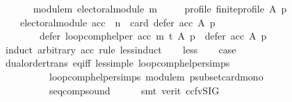 \begin{isabellebody}
\ \ \isanewline
\ \ \ \ module{\isacharunderscore}{\kern0pt}m{\isacharcolon}{\kern0pt}\ {\isachardoublequoteopen}electoral{\isacharunderscore}{\kern0pt}module\ m{\isachardoublequoteclose}\ \isanewline
\ \ \ \ profile{\isacharcolon}{\kern0pt}\ {\isachardoublequoteopen}finite{\isacharunderscore}{\kern0pt}profile\ A\ p{\isachardoublequoteclose}\isanewline
\ \ \isanewline
\ \ \ \ {\isachardoublequoteopen}{\isacharparenleft}{\kern0pt}electoral{\isacharunderscore}{\kern0pt}module\ acc\ {\isasymand}\ n\ {\isacharequal}{\kern0pt}\ card\ {\isacharparenleft}{\kern0pt}defer\ acc\ A\ p{\isacharparenright}{\kern0pt}{\isacharparenright}{\kern0pt}\ {\isasymLongrightarrow}\isanewline
\ \ \ \ \ \ \ \ defer\ {\isacharparenleft}{\kern0pt}loop{\isacharunderscore}{\kern0pt}comp{\isacharunderscore}{\kern0pt}helper\ acc\ m\ t{\isacharparenright}{\kern0pt}\ A\ p\ {\isasymsubseteq}\ defer\ acc\ A\ p{\isachardoublequoteclose}\isanewline
%
\isadelimproof
%
\endisadelimproof
%
\isatagproof
{}\isamarkupfalse%
\ {\isacharparenleft}{\kern0pt}induct\ arbitrary{\isacharcolon}{\kern0pt}\ acc\ rule{\isacharcolon}{\kern0pt}\ less{\isacharunderscore}{\kern0pt}induct{\isacharparenright}{\kern0pt}\isanewline
\ \ \isamarkupfalse%
\ {\isacharparenleft}{\kern0pt}less{\isacharparenright}{\kern0pt}\isanewline
\ \ \isamarkupfalse%
\ {\isacharquery}{\kern0pt}case\isanewline
\ \ \ \ \isamarkupfalse%
\ dual{\isacharunderscore}{\kern0pt}order{\isachardot}{\kern0pt}trans\ eq{\isacharunderscore}{\kern0pt}iff\ less{\isacharunderscore}{\kern0pt}imp{\isacharunderscore}{\kern0pt}le\ loop{\isacharunderscore}{\kern0pt}comp{\isacharunderscore}{\kern0pt}helper{\isachardot}{\kern0pt}simps{\isacharparenleft}{\kern0pt}{}{\isacharparenright}{\kern0pt}\isanewline
\ \ \ \ \ \ \ \ \ \ loop{\isacharunderscore}{\kern0pt}comp{\isacharunderscore}{\kern0pt}helper{\isachardot}{\kern0pt}simps{\isacharparenleft}{\kern0pt}{}{\isacharparenright}{\kern0pt}\ module{\isacharunderscore}{\kern0pt}m\ psubset{\isacharunderscore}{\kern0pt}card{\isacharunderscore}{\kern0pt}mono\isanewline
\ \ \ \ \ \ \ \ \ \ seq{\isacharunderscore}{\kern0pt}comp{\isacharunderscore}{\kern0pt}sound\isanewline
\ \ \ \ \isamarkupfalse%
\ {\isacharparenleft}{\kern0pt}smt\ {\isacharparenleft}{\kern0pt}verit{\isacharcomma}{\kern0pt}\ ccfv{\isacharunderscore}{\kern0pt}SIG{\isacharparenright}{\kern0pt}{\isacharparenright}{\kern0pt}\isanewline
{}\isamarkupfalse%
%
\endisatagproof
{\isafoldproof}%

\end{isabellebody}
